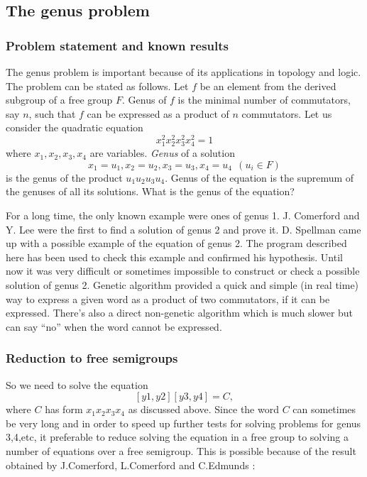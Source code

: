 \documentclass{article}
\begin{document}
\subsection{The genus problem}

\subsubsection{Problem statement and known results}

The genus problem is important because of its applications in topology
and logic. The problem can be stated as follows. Let $f$ be an element
from the derived subgroup of a free group $F$. Genus of $f$ is the
minimal number of commutators, say $n$, such that $f$ can be expressed
as a product of $n$ commutators. Let us consider the quadratic
equation
\[
x_1^2 x_2^2 x_3^2 x_4^2 = 1 
\]
where $x_1,x_2,x_3,x_4$ are variables. {\em Genus } of a solution 
\[
x_1= u_1, x_2 = u_2, x_3 = u_3, x_4 = u_4 \ \  ( u_i \in F )
\]
is the genus of the product $u_1 u_2 u_3 u_4$.  Genus of the equation
is the supremum of the genuses of all its solutions.  What is the
genus of the equation?

For a long time, the only known example were ones of genus
1. J. Comerford and Y. Lee \cite{C&L} were the first to find a
solution of genus 2 and prove it. D. Spellman came up with a possible
example of the equation of genus 2. The program described here has
been used to check this example and confirmed his hypothesis. Until
now it was very difficult or sometimes impossible to construct or
check a possible solution of genus 2. Genetic algorithm provided a
quick and simple (in real time) way to express a given word as a
product of two commutators, if it can be expressed. There's also a
direct non-genetic algorithm which is much slower but can say ``no''
when the word cannot be expressed.

\subsubsection{Reduction to free semigroups}

So we need to solve the equation 
\[
[y1,y2][y3,y4] = C,
\]
where $C$ has form $x_1 x_2 x_3 x_4$ as discussed above. Since the
word $C$ can sometimes be very long and in order to speed up further
tests for solving problems for genus 3,4,etc, it preferable to reduce
solving the equation in a free group to solving a number of equations
over a free semigroup. This is possible because of the result obtained
by J.Comerford, L.Comerford and C.Edmunds \cite{CC&E}:
\end{document}
